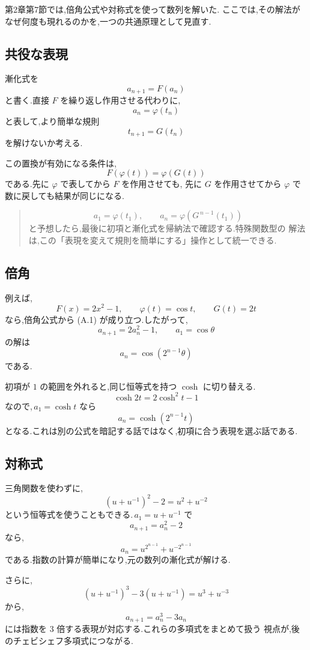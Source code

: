 第2章第7節では,倍角公式や対称式を使って数列を解いた.
ここでは,その解法がなぜ何度も現れるのかを,一つの共通原理として見直す.

\subsection{共役な表現}

漸化式を
\[
  a_{n+1}=F(a_n)
\]
と書く.直接 $F$ を繰り返し作用させる代わりに,
\[
  a_n=\varphi(t_n)
\]
と表して,より簡単な規則
\[
  t_{n+1}=G(t_n)
\]
を解けないか考える.

この置換が有効になる条件は,
\[
  F(\varphi(t))=\varphi(G(t))
  \tag{A.1}
\]
である.先に $\varphi$ で表してから $F$ を作用させても,
先に $G$ を作用させてから $\varphi$ で数に戻しても結果が同じになる.

\begin{quote}
\[
  a_1=\varphi(t_1),
  \qquad
  a_n=\varphi\left(G^{\,n-1}(t_1)\right)
\]
と予想したら,最後に初項と漸化式を帰納法で確認する.特殊関数型の
解法は,この「表現を変えて規則を簡単にする」操作として統一できる.
\end{quote}

\subsection{倍角}

例えば,
\[
  F(x)=2x^2-1,
  \qquad
  \varphi(t)=\cos t,
  \qquad
  G(t)=2t
\]
なら,倍角公式から (A.1) が成り立つ.したがって,
\[
  a_{n+1}=2a_n^2-1,
  \qquad
  a_1=\cos\theta
\]
の解は
\[
  a_n=\cos(2^{n-1}\theta)
\]
である.

初項が $1$ の範囲を外れると,同じ恒等式を持つ $\cosh$ に切り替える.
\[
  \cosh 2t=2\cosh^2t-1
\]
なので,\,$a_1=\cosh t$ なら
\[
  a_n=\cosh(2^{n-1}t)
\]
となる.これは別の公式を暗記する話ではなく,初項に合う表現を選ぶ話である.

\subsection{対称式}

三角関数を使わずに,
\[
  (u+u^{-1})^2-2=u^2+u^{-2}
  \tag{A.2}
\]
という恒等式を使うこともできる.\,$a_1=u+u^{-1}$ で
\[
  a_{n+1}=a_n^2-2
\]
なら,
\[
  a_n=u^{2^{n-1}}+u^{-2^{n-1}}
\]
である.指数の計算が簡単になり,元の数列の漸化式が解ける.

さらに,
\[
  (u+u^{-1})^3-3(u+u^{-1})=u^3+u^{-3}
\]
から,
\[
  a_{n+1}=a_n^3-3a_n
\]
には指数を $3$ 倍する表現が対応する.これらの多項式をまとめて扱う
視点が,後のチェビシェフ多項式につながる.

